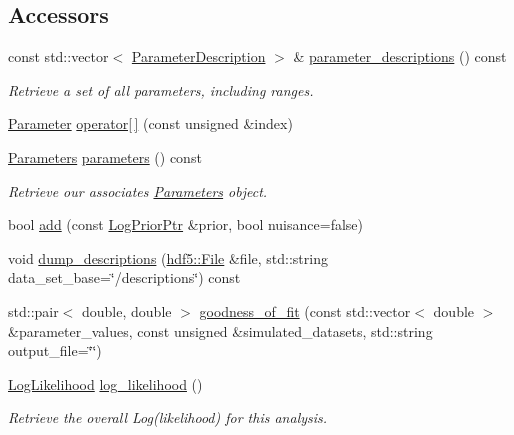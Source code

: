 \subsection*{Accessors}
\label{_amgrp04cb611d2bf0c8edd5b113799b30e174}
 \begin{DoxyCompactItemize}
\item 
const std::vector$<$ \hyperlink{structeos_1_1ParameterDescription}{ParameterDescription} $>$ \& \hyperlink{classeos_1_1Analysis_a8cc99f2ff2c99e2977c9dab68ff13c8b}{parameter\_\-descriptions} () const 
\begin{DoxyCompactList}\small\item\em Retrieve a set of all parameters, including ranges. \item\end{DoxyCompactList}\item 
\hyperlink{classeos_1_1Parameter}{Parameter} \hyperlink{classeos_1_1Analysis_a963c134ff67911b8a4bc90fc1342e3a3}{operator\mbox{[}$\,$\mbox{]}} (const unsigned \&index)
\item 
\hyperlink{classeos_1_1Parameters}{Parameters} \hyperlink{classeos_1_1Analysis_a750da19ea2292416b8b42dc2c259935e}{parameters} () const 
\begin{DoxyCompactList}\small\item\em Retrieve our associates \hyperlink{classeos_1_1Parameters}{Parameters} object. \item\end{DoxyCompactList}\item 
bool \hyperlink{classeos_1_1Analysis_a3062ad70d7888517d3fa09e7dcb183cf}{add} (const \hyperlink{namespaceeos_ac5481e3b46ee55ff24606ee7f6e78651}{LogPriorPtr} \&prior, bool nuisance=false)
\item 
void \hyperlink{classeos_1_1Analysis_a444e11133ea75c88fb2579f1ac73c8c3}{dump\_\-descriptions} (\hyperlink{classeos_1_1hdf5_1_1File}{hdf5::File} \&file, std::string data\_\-set\_\-base=\char`\"{}/descriptions\char`\"{}) const 
\item 
std::pair$<$ double, double $>$ \hyperlink{classeos_1_1Analysis_a7146dc3458d035af4546890b0795146b}{goodness\_\-of\_\-fit} (const std::vector$<$ double $>$ \&parameter\_\-values, const unsigned \&simulated\_\-datasets, std::string output\_\-file=\char`\"{}\char`\"{})
\item 
\hyperlink{classeos_1_1LogLikelihood}{LogLikelihood} \hyperlink{classeos_1_1Analysis_a29da23044cd892ac972ed62262276445}{log\_\-likelihood} ()
\begin{DoxyCompactList}\small\item\em Retrieve the overall Log(likelihood) for this analysis. \item\end{DoxyCompactList}\item 

\end{DoxyCompactItemize}

